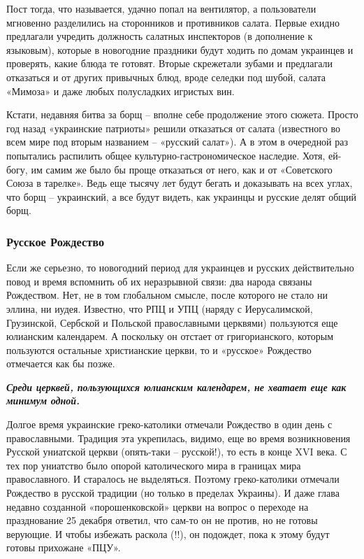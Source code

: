 Пост тогда, что называется, удачно попал на вентилятор, а пользователи
мгновенно разделились на сторонников и противников салата. Первые ехидно
предлагали учредить должность салатных инспекторов (в дополнение к языковым),
которые в новогодние праздники будут ходить по домам украинцев и проверять,
какие блюда те готовят. Вторые скрежетали зубами и предлагали отказаться и от
других привычных блюд, вроде селедки под шубой, салата «Мимоза» и даже любых
полусладких игристых вин.

Кстати, недавняя битва за борщ – вполне себе продолжение этого сюжета. Просто
год назад «украинские патриоты» решили отказаться от салата (известного во всем
мире под вторым названием – «русский салат»). А в этом в очередной раз
попытались распилить общее культурно-гастрономическое наследие. Хотя, ей-богу,
им самим же было бы проще отказаться от него, как и от «Советского Союза в
тарелке». Ведь еще тысячу лет будут бегать и доказывать на всех углах, что борщ
– украинский, а все будут видеть, как украинцы и русские делят общий борщ.  

\subsubsection{Русское Рождество}

Если же серьезно, то новогодний период для украинцев и русских действительно
повод и время вспомнить об их неразрывной связи: два народа связаны Рождеством.
Нет, не в том глобальном смысле, после которого не стало ни эллина, ни иудея.
Известно, что РПЦ и УПЦ (наряду с Иерусалимской, Грузинской, Сербской и
Польской православными церквями) пользуются еще юлианским календарем. А
поскольку он отстает от григорианского, которым пользуются остальные
христианские церкви, то и «русское» Рождество отмечается как бы позже.

\begin{leftbar}
  \begingroup
    \em\Large\bfseries\color{blue}
    Среди церквей, пользующихся юлианским календарем, не хватает еще как минимум одной. 
  \endgroup
\end{leftbar}

Долгое время украинские греко-католики отмечали Рождество в один день с
православными. Традиция эта укрепилась, видимо, еще во время возникновения
Русской униатской церкви (опять-таки – русской!), то есть в конце XVI века. С
тех пор униатство было опорой католического мира в границах мира православного.
И старалось не выделяться. Поэтому греко-католики отмечали Рождество в русской
традиции (но только в пределах Украины). И даже глава недавно созданной
«порошенковской» церкви на вопрос о переходе на празднование 25 декабря
ответил, что сам-то он не против, но не готовы верующие. И чтобы избежать
раскола (!!), он подождет, пока к этому будут готовы прихожане «ПЦУ». 

